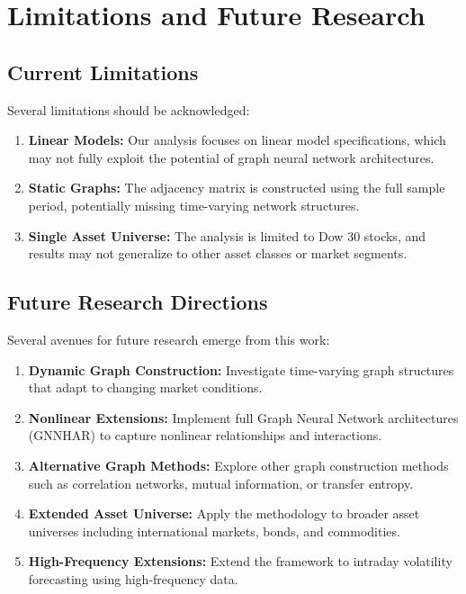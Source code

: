\documentclass[12pt,a4paper]{article}
\begin{document}
\section{Limitations and Future Research}

\subsection{Current Limitations}

Several limitations should be acknowledged:

\begin{enumerate}
\item \textbf{Linear Models:} Our analysis focuses on linear model specifications, which may not fully exploit the potential of graph neural network architectures.

\item \textbf{Static Graphs:} The adjacency matrix is constructed using the full sample period, potentially missing time-varying network structures.

\item \textbf{Single Asset Universe:} The analysis is limited to Dow 30 stocks, and results may not generalize to other asset classes or market segments.
\end{enumerate}

\subsection{Future Research Directions}

Several avenues for future research emerge from this work:

\begin{enumerate}
\item \textbf{Dynamic Graph Construction:} Investigate time-varying graph structures that adapt to changing market conditions.

\item \textbf{Nonlinear Extensions:} Implement full Graph Neural Network architectures (GNNHAR) to capture nonlinear relationships and interactions.

\item \textbf{Alternative Graph Methods:} Explore other graph construction methods such as correlation networks, mutual information, or transfer entropy.

\item \textbf{Extended Asset Universe:} Apply the methodology to broader asset universes including international markets, bonds, and commodities.

\item \textbf{High-Frequency Extensions:} Extend the framework to intraday volatility forecasting using high-frequency data.
\end{enumerate}
\end{document}
